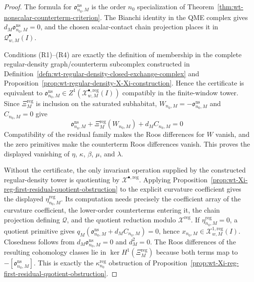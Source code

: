 \begin{proof}
  The formula for \(\mathfrak o^{\mathrm{ns}}_{n_0,M}\) is the order
  \(n_0\) specialization of
  Theorem~\ref{thm:wt-nonscalar-counterterm-criterion}.  The Bianchi
  identity in the QME complex gives
  \(d_M\mathfrak o^{\mathrm{ns}}_{n_0,M}=0\), and the chosen
  scalar-contact chain projection places it in
  \(\mathcal Q^\bullet_{w,M}(I)\).

  Conditions (R1)--(R4) are exactly the definition of membership in the
  complete regular-density graph/counterterm subcomplex constructed in
  Definition~\ref{defn:wt-regular-density-closed-exchange-complex} and
  Proposition~\ref{prop:wt-regular-density-X-Xi-construction}.  Hence the
  certificate is equivalent to
  \(\mathfrak o^{\mathrm{ns}}_{n_0,M}\in
  Z^1(\mathcal X^{\bullet,\mathrm{reg}}_{w,M}(I))\) compatibly in the
  finite-window tower.  Since
  \(\Xi^{\mathrm{reg}}_M\) is inclusion on the saturated subhabitat,
  \(W_{n_0,M}=-\mathfrak o^{\mathrm{ns}}_{n_0,M}\) and
  \(C_{n_0,M}=0\) give
  \[
    \mathfrak o^{\mathrm{ns}}_{n_0,M}
    +\Xi^{\mathrm{reg}}_M(W_{n_0,M})
    +d_MC_{n_0,M}=0
  \]
  Compatibility of the residual family makes the Roos differences for
  \(W\) vanish, and the zero primitives make the counterterm Roos
  differences vanish.  This proves the displayed vanishing of
  \(\eta\), \(\kappa\), \(\beta\), \(\mu\), and \(\lambda\).

  Without the certificate, the only invariant operation supplied by the
  constructed regular-density tower is quotienting by
  \(\mathcal X^{\bullet,\mathrm{reg}}\).  Applying
  Proposition~\ref{prop:wt-Xi-reg-first-residual-quotient-obstruction} to
  the explicit curvature coefficient gives the displayed
  \(\eta^{\mathrm{reg}}_{n_0,M}\).  Its computation needs precisely the
  coefficient array of the curvature coefficient, the lower-order
  counterterms entering it, the chain projection defining
  \(\mathcal Q\), and the quotient reduction modulo
  \(\mathcal X^{\mathrm{reg}}\).  If \(\eta^{\mathrm{reg}}_{n_0,M}=0\),
  a quotient primitive gives
  \(q_M(\mathfrak o^{\mathrm{ns}}_{n_0,M}+d_MC_{n_0,M})=0\), hence
  \(x_{n_0,M}\in\mathcal X^{1,\mathrm{reg}}_{w,M}(I)\).  Closedness follows
  from \(d_M\mathfrak o^{\mathrm{ns}}_{n_0,M}=0\) and \(d_M^2=0\).  The
  Roos differences of the resulting cohomology classes lie in
  \(\ker H^1(\Xi^{\mathrm{reg}}_M)\) because both terms map to
  \(-[\mathfrak o^{\mathrm{ns}}_{n_0,M}]\).  This is exactly the
  \(\kappa^{\mathrm{reg}}_{n_0}\) obstruction of
  Proposition~\ref{prop:wt-Xi-reg-first-residual-quotient-obstruction}.
\end{proof}

